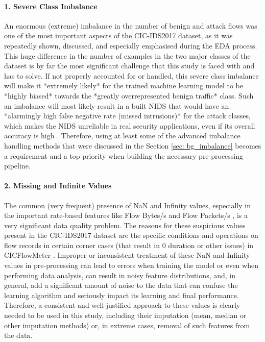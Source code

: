 \paragraph{1. Severe Class Imbalance} 
An enormous (extreme) imbalance in the number of benign and attack flows was one of the most important aspects of the CIC-IDS2017 dataset, as it was repeatedly shown, discussed, and especially emphasised during the EDA process. This huge difference in the number of examples in the two major classes of the dataset is by far the most significant challenge that this study is faced with and has to solve. If not properly accounted for or handled, this severe class imbalance will make it *extremely likely* for the trained machine learning model to be *highly biased* towards the *greatly overrepresented benign traffic* class. Such an imbalance will most likely result in a built NIDS that would have an *alarmingly high false negative rate (missed intrusions)* for the attack classes, which makes the NIDS unreliable in real security applications, even if its overall accuracy is high \parencite{mahfouz2022systematic}. Therefore, using at least some of the advanced imbalance handling methods that were discussed in the Section \ref{sec: bg_imbalance} becomes a requirement and a top priority when building the necessary pre-processing pipeline.

\paragraph{2. Missing and Infinite Values} 
The common (very frequent) presence of NaN and Infinity values, especially in the important rate-based features like Flow Bytes/s and Flow Packets/s , is a very significant data quality problem. The reasons for these suspicious values present in the CIC-IDS2017 dataset are the specific conditions and operations on flow records in certain corner cases (that result in 0 duration or other issues) in CICFlowMeter \parencite{sharafaldin2018toward}. Improper or inconsistent treatment of these NaN and Infinity values in pre-processing can lead to errors when training the model or even when performing data analysis, can result in noisy feature distributions, and, in general, add a significant amount of noise to the data that can confuse the learning algorithm and seriously impact its learning and final performance. Therefore, a consistent and well-justified approach to these values is clearly needed to be used in this study, including their imputation (mean, median or other imputation methods) or, in extreme cases, removal of such features from the data.

